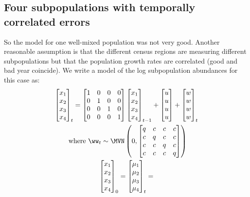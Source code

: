 \subsection{Four subpopulations with temporally correlated errors}
So the model for one well-mixed population was not very good.  Another reasonable assumption is that the different census regions are measuring different subpopulations but that the population growth rates are correlated (good and bad year coincide).  We write a model of the log subpopulation abundances for this case as:
\begin{equation}
\begin{gathered}
\begin{bmatrix}x_1\\x_2\\x_3\\x_4\end{bmatrix}_t = 
\begin{bmatrix}
    1 & 0 & 0 & 0 \\
    0 & 1 & 0 & 0\\
    0 & 0 & 1 & 0 \\
    0 & 0 & 0 & 1 \end{bmatrix}\begin{bmatrix}x_1\\x_2\\x_3\\x_4\end{bmatrix}_{t-1} +
\begin{bmatrix}u\\u\\u\\u\end{bmatrix} + \begin{bmatrix}w\\w\\w\\w\end{bmatrix}_t \\
\textrm{ where } \ww_t \sim \MVN\begin{pmatrix}0,
\begin{bmatrix}
    q & c & c & c \\
    c & q & c & c\\
    c & c & q & c \\
    c & c & c & q \end{bmatrix}\end{pmatrix}\\
\begin{bmatrix}x_1\\x_2\\x_3\\x_4\end{bmatrix}_0 = \begin{bmatrix}\mu_1\\\mu_2\\\mu_3\\\mu_4\end{bmatrix}_t = 
\end{gathered}
\label{eq:seg}
\end{equation}
